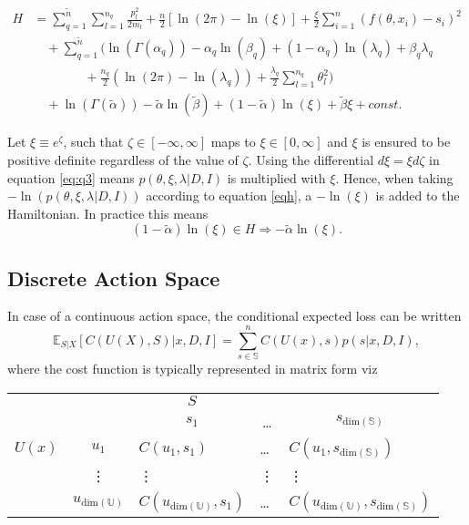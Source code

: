 	\begin{equation}
		\begin{split}
			H&=\sum_{q=1}^{\tilde{n}}\sum_{l=1}^{n_q}\frac{p_{l}^2}{2m_{l}}+\frac{n}{2}[\ln(2\pi)-\ln(\xi)] +\frac{\xi}{2}\sum_{i=1}^{n}(f(\theta,x_i)-s_i)^2\\
			&\quad+\sum_{q=1}^{\tilde{n}}\bigg(\ln(\Gamma(\alpha_q))-\alpha_q\ln(\beta_q)+(1-\alpha_q)\ln(\lambda_q)+\beta_q\lambda_q\\
			&\qquad\qquad+\frac{n_q}{2}(\ln(2\pi)-\ln(\lambda_q))+\frac{\lambda_q}{2}\sum_{l=1}^{n_q}\theta_l^2\bigg)\\
			&\quad+\ln(\Gamma(\tilde{\alpha}))-\tilde{\alpha}\ln(\tilde{\beta})+(1-\tilde{\alpha})\ln(\xi)+\tilde{\beta}\xi+const.
		\end{split}
		\label{eqh2}
	\end{equation}
	
	\begin{example}
		Let $\xi \equiv e^\zeta$, such that $\zeta\in [-\infty,\infty]$ maps to $\xi\in[0,\infty]$ and $\xi$ is ensured to be positive definite regardless of the value of $\zeta$. Using the differential $d\xi =  \xi d\zeta$ in equation \eqref{eq:q3} means $p(\theta,\xi,\lambda|D,I)$ is multiplied with $\xi$. Hence, when taking $-\ln(p(\theta,\xi,\lambda|D,I))$ according to equation \eqref{eqh}, a $-\ln(\xi)$ is added to the Hamiltonian. In practice this means
		\begin{equation}
			(1-\tilde{\alpha})\ln(\xi)\in H\Rightarrow -\tilde{\alpha}\ln(\xi).
		\end{equation} 	
	\end{example}

	\subsection{Discrete Action Space}
	In case of a continuous action space, the conditional expected loss can be written
	\begin{equation}
		\mathbb{E}_{S|X}[C(U(X), S)|x,D,I] = \sum_{s\in \mathbb{S}}^nC(U(x),s)p(s|x,D,I),
	\end{equation}
	where the cost function is typically represented in matrix form viz
	\begin{center}
		\begin{tabular}{ c  c  c  c  c  }
			&& $S$& & \\
			&& $s_1$ & \dots & $s_{\text{dim}(\mathbb{S})}$ \\
			\cline{3-5}
			$U(x)$ & $u_1$& \multicolumn{1}{|l}{$C(u_1, s_1)$} &\multicolumn{1}{l}{\dots}&\multicolumn{1}{l|}{$C(u_1, s_{\text{dim}(\mathbb{S})})$} \\
			& \vdots & \multicolumn{1}{|l}{\vdots} &\multicolumn{1}{l}{\vdots}&\multicolumn{1}{l|}{\vdots} \\
			& $u_{\text{dim}(\mathbb{U})}$ & \multicolumn{1}{|l}{$C(u_{\text{dim}(\mathbb{U})}, s_1)$} &\multicolumn{1}{l}{\dots}&\multicolumn{1}{l|}{$C(u_{\text{dim}(\mathbb{U})}, s_{\text{dim}(\mathbb{S})})$} \\
			\cline{3-5}
		\end{tabular}
	\end{center}

